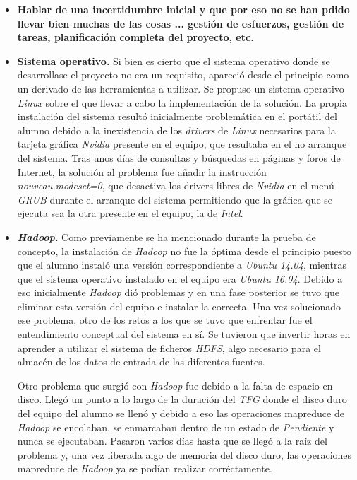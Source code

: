 \begin{itemize}
\item \textbf{Hablar de una incertidumbre inicial y que por eso no se han pdido llevar bien muchas de las cosas ... gestión de esfuerzos, gestión de tareas, planificación completa del proyecto, etc.} 
\item \textbf{Sistema operativo.} Si bien es cierto que el sistema operativo donde se desarrollase el proyecto no era un requisito, apareció desde el principio como un derivado de las herramientas a utilizar. Se propuso un sistema operativo \textit{Linux} \cite{wikilinux} sobre el que llevar a cabo la implementación de la solución. 
La propia instalación del sistema resultó inicialmente problemática en el portátil del alumno debido a la inexistencia de los \textit{drivers} de \textit{Linux} necesarios para la tarjeta gráfica \textit{Nvidia} \cite{wikinvidia} presente en el equipo, que resultaba en el no arranque del sistema. Tras unos días de consultas y búsquedas en páginas y foros de Internet, la solución al problema fue añadir la instrucción \textit{nouveau.modeset=0}, que desactiva los drivers libres de \textit{Nvidia} en el menú \textit{GRUB} \cite{grub} durante el arranque del sistema permitiendo que la gráfica que se ejecuta sea la otra presente en el equipo, la de \textit{Intel}.

\item \textbf{\textit{Hadoop}.} Como previamente se ha mencionado durante la prueba de concepto, la instalación de \textit{Hadoop} no fue la óptima desde el principio puesto que el alumno instaló una versión correspondiente a \textit{Ubuntu 14.04}, mientras que el sistema operativo instalado en el equipo era \textit{Ubuntu 16.04}. Debido a eso inicialmente \textit{Hadoop} dió problemas y en una fase posterior se tuvo que eliminar esta versión del equipo e instalar la correcta. Una vez solucionado ese problema, otro de los retos a los que se tuvo que enfrentar fue el entendimiento conceptual del sistema en sí. Se tuvieron que invertir horas en aprender a utilizar el sistema de ficheros \textit{HDFS}, algo necesario para el almacén de los datos de entrada de las diferentes fuentes. 
\par
Otro problema que surgió con \textit{Hadoop} fue debido a la falta de espacio en disco. Llegó un punto a lo largo de la duración del \textit{TFG} donde el disco duro del equipo del alumno se llenó y debido a eso las operaciones \gls{mapreduce} de \textit{Hadoop} se encolaban, se enmarcaban dentro de un estado de \textit{Pendiente} y nunca se ejecutaban. Pasaron varios días hasta que se llegó a la raíz del problema y, una vez liberada algo de memoria del disco duro, las operaciones \gls{mapreduce} de \textit{Hadoop} ya se podían realizar corréctamente. 


\end{itemize}

